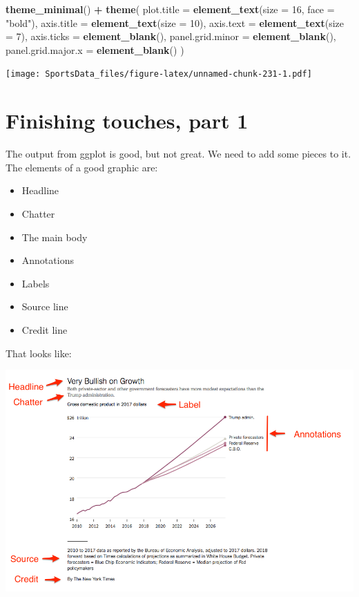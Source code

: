 \documentclass[]{book}
\newenvironment{Shaded}{\begin{snugshade}}{\end{snugshade}}
\newcommand{\KeywordTok}[1]{\textcolor[rgb]{0.13,0.29,0.53}{\textbf{#1}}}
\newcommand{\DataTypeTok}[1]{\textcolor[rgb]{0.13,0.29,0.53}{#1}}
\newcommand{\DecValTok}[1]{\textcolor[rgb]{0.00,0.00,0.81}{#1}}
\newcommand{\StringTok}[1]{\textcolor[rgb]{0.31,0.60,0.02}{#1}}
\newcommand{\OperatorTok}[1]{\textcolor[rgb]{0.81,0.36,0.00}{\textbf{#1}}}
\newcommand{\NormalTok}[1]{#1}
\providecommand{\tightlist}{%
  \setlength{\itemsep}{0pt}\setlength{\parskip}{0pt}}
\begin{document}
\begin{Shaded}
\begin{Highlighting}[]
\StringTok{  }\KeywordTok{theme_minimal}\NormalTok{() }\OperatorTok{+}\StringTok{ }
\StringTok{  }\KeywordTok{theme}\NormalTok{(}
    \DataTypeTok{plot.title =} \KeywordTok{element_text}\NormalTok{(}\DataTypeTok{size =} \DecValTok{16}\NormalTok{, }\DataTypeTok{face =} \StringTok{"bold"}\NormalTok{),}
    \DataTypeTok{axis.title =} \KeywordTok{element_text}\NormalTok{(}\DataTypeTok{size =} \DecValTok{10}\NormalTok{),}
    \DataTypeTok{axis.text =} \KeywordTok{element_text}\NormalTok{(}\DataTypeTok{size =} \DecValTok{7}\NormalTok{),}
    \DataTypeTok{axis.ticks =} \KeywordTok{element_blank}\NormalTok{(),}
    \DataTypeTok{panel.grid.minor =} \KeywordTok{element_blank}\NormalTok{(),}
    \DataTypeTok{panel.grid.major.x =} \KeywordTok{element_blank}\NormalTok{()}
\NormalTok{  )}
\end{Highlighting}
\end{Shaded}

\texttt{[image: SportsData\_files/figure-latex/unnamed-chunk-231-1.pdf]}

\chapter{Finishing touches, part 1}\label{finishing-touches-part-1}

The output from ggplot is good, but not great. We need to add some
pieces to it. The elements of a good graphic are:

\begin{itemize}
\tightlist
\item
  Headline
\item
  Chatter
\item
  The main body
\item
  Annotations
\item
  Labels
\item
  Source line
\item
  Credit line
\end{itemize}

That looks like:

\includegraphics[width=12.97in]{images/chartannotated}
\end{document}
